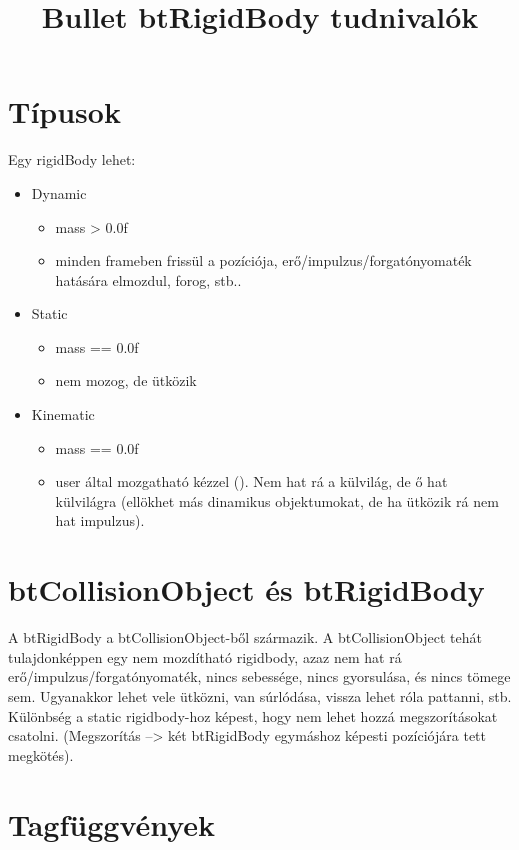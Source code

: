 \documentclass[12p,a4paper,notitlepage]{scrartcl}
\title{Bullet btRigidBody tudnivalók}
\subtitle{}
\date{}
\begin{document}
\maketitle

\section*{Típusok}

Egy rigidBody lehet:
\begin{itemize}
\item Dynamic
\begin{itemize}
\item mass > 0.0f
\item minden frameben frissül a pozíciója, erő/impulzus/forgatónyomaték hatására elmozdul, forog, stb..
\end{itemize}
\item Static
\begin{itemize}
\item mass == 0.0f
\item nem mozog, de ütközik
\end{itemize}
\item Kinematic
\begin{itemize}
\item mass == 0.0f
\item user által mozgatható kézzel (). Nem hat rá a külvilág, de ő hat külvilágra (ellökhet más dinamikus objektumokat, de ha ütközik rá nem hat impulzus).
\end{itemize}
\end{itemize}

\section*{btCollisionObject és btRigidBody}
A btRigidBody a btCollisionObject-ből származik. A btCollisionObject tehát tulajdonképpen egy nem mozdítható rigidbody, azaz nem hat rá erő/impulzus/forgatónyomaték, nincs sebessége, nincs gyorsulása, és nincs tömege sem. Ugyanakkor lehet vele ütközni, van súrlódása, vissza lehet róla pattanni, stb. \newline
Különbség a static rigidbody-hoz képest, hogy nem lehet hozzá megszorításokat csatolni. (Megszorítás --> két btRigidBody egymáshoz képesti pozíciójára tett megkötés).


\section*{Tagfüggvények}
\end{document}

